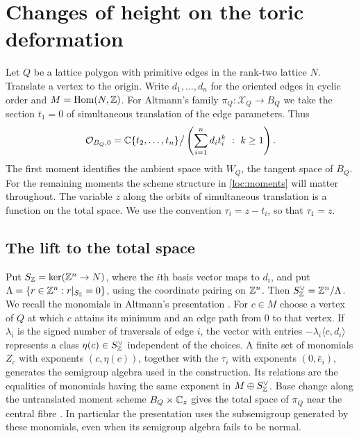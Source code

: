 \section{Changes of height on the toric deformation}\label{sec:local}

Let $Q$ be a lattice polygon with primitive edges in the rank-two
lattice $N$. Translate a vertex to the origin. Write $d_1,\ldots,d_n$
for the oriented edges in cyclic order and $M=\operatorname{Hom}(N,\mathbb Z)$.
For Altmann's family $\pi_Q:\mathcal X_Q\to B_Q$ we take the section
$t_1=0$ of simultaneous translation of the edge parameters. Thus
\begin{equation}\label{loc:moments}
 \mathcal O_{B_Q,0}=
 \mathbb C\{t_2,\ldots,t_n\}\big/
 \left(\sum_{i=1}^n d_i t_i^k\ :\ k\geq 1\right).
\end{equation}
The first moment identifies the ambient space with $W_Q$, the tangent
space of $B_Q$. For the remaining moments the scheme structure in
\eqref{loc:moments} will matter throughout. The variable $z$ along the
orbits of simultaneous translation is a function on the total space.
We use the convention $\tau_i=z-t_i$, so that $\tau_1=z$.

\subsection{The lift to the total space}
Put $S_\mathbb Z=\ker(\mathbb Z^n\to N)$, where the $i$th basis vector maps to
$d_i$, and put $\Lambda=\{r\in\mathbb Z^n:r|_{S_\mathbb Z}=0\}$, using the
coordinate pairing on $\mathbb Z^n$. Then $S_\mathbb Z^\vee=\mathbb Z^n/\Lambda$.
We recall the monomials in Altmann's presentation
\cite[\S\S4.4--5.3]{Alt}. For $c\in M$ choose a vertex of $Q$ at
which $c$ attains its minimum and an edge path from $0$ to that
vertex. If $\lambda_i$ is the signed number of traversals of edge $i$,
the vector with entries $-\lambda_i\langle c,d_i\rangle$ represents
a class $\eta(c)\in S_\mathbb Z^\vee$ independent of the choices. A finite
set of monomials $Z_c$ with exponents $(c,\eta(c))$, together with the
$\tau_i$ with exponents $(0,\bar e_i)$, generates the semigroup algebra
used in the construction. Its relations are the equalities of monomials
having the same exponent in $M\oplus S_\mathbb Z^\vee$. Base change along the
untranslated moment scheme $B_Q\times\mathbb C_z$ gives the total space of
$\pi_Q$ near the central fibre \cite[Theorem~5.1 and \S7]{Alt}.
In particular the presentation uses the subsemigroup generated by these
monomials, even when its semigroup algebra fails to be normal.

